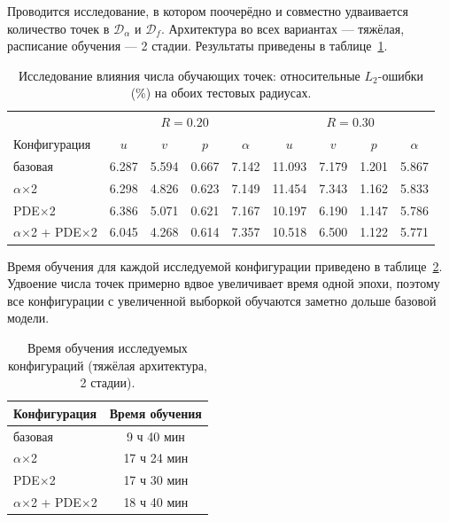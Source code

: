 \documentclass[12pt,a4paper]{article}
\begin{document}
Проводится исследование, в котором поочерёдно и совместно удваивается количество
точек в \(\mathcal{D}_\alpha\) и \(\mathcal{D}_f\). Архитектура во всех
вариантах --- тяжёлая, расписание обучения --- 2 стадии. Результаты приведены в
таблице~\ref{tab:ablation}.

\begin{table}[H]
    \centering
    \begin{tabular}{l|cccc|cccc}
        \hline
        & \multicolumn{4}{c|}{\(R=0.20\)} & \multicolumn{4}{c}{\(R=0.30\)} \\
        Конфигурация & \(u\) & \(v\) & \(p\) & \(\alpha\) & \(u\) & \(v\) & \(p\) & \(\alpha\) \\
        \hline
        базовая                           & 6.287 & 5.594 & 0.667 & 7.142 & 11.093 & 7.179 & 1.201 & 5.867 \\
        \(\alpha\)$\times$2               & 6.298 & 4.826 & 0.623 & 7.149 & 11.454 & 7.343 & 1.162 & 5.833 \\
        PDE$\times$2                      & 6.386 & 5.071 & 0.621 & 7.167 & 10.197 & 6.190 & 1.147 & 5.786 \\
        \(\alpha\)$\times$2 + PDE$\times$2 & 6.045 & 4.268 & 0.614 & 7.357 & 10.518 & 6.500 & 1.122 & 5.771 \\
        \hline
    \end{tabular}
    \caption{Исследование влияния числа обучающих точек: относительные \(L_2\)-ошибки (\%) на обоих тестовых радиусах.}
    \label{tab:ablation}
\end{table}

Время обучения для каждой исследуемой конфигурации приведено в
таблице~\ref{tab:ablation_time}. Удвоение числа точек примерно вдвое увеличивает
время одной эпохи, поэтому все конфигурации с увеличенной выборкой обучаются
заметно дольше базовой модели.

\begin{table}[H]
    \centering
    \begin{tabular}{l|c}
        \hline
        Конфигурация & Время обучения \\
        \hline
        базовая               & 9 ч 40 мин \\
        \(\alpha\)$\times$2   & 17 ч 24 мин \\
        PDE$\times$2          & 17 ч 30 мин \\
        \(\alpha\)$\times$2 + PDE$\times$2 & 18 ч 40 мин \\
        \hline
    \end{tabular}
    \caption{Время обучения исследуемых конфигураций (тяжёлая архитектура, 2 стадии).}
    \label{tab:ablation_time}
\end{table}
\end{document}
